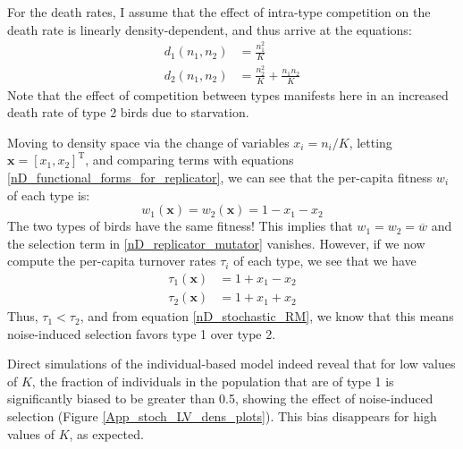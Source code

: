For the death rates, I assume that the effect of intra-type competition on the death rate is linearly density-dependent, and thus arrive at the equations:
\begin{equation}
\label{App_example_stoch_LV_death_rates}
\begin{aligned}
	d_{1}({n_1},{n_2}) &= \frac{{n_1^2}}{K}\\
	d_{2}({n_1},{n_2}) &= \frac{{n_2^2}}{K} + \frac{{n_1}{n_2}}{K}
\end{aligned}
\end{equation}
Note that the effect of competition between types manifests here in an increased death rate of type 2 birds due to starvation.

Moving to density space via the change of variables $x_i = n_i/K$, letting $\mathbf{x} = [x_1, x_2]^{\mathrm{T}}$, and comparing terms with equations \eqref{nD_functional_forms_for_replicator}, we can see that the per-capita fitness $w_i$ of each type is:
\begin{equation*}
	w_{1}(\mathbf{x}) = w_{2}(\mathbf{x}) = 1 - x_1 - x_2
\end{equation*}
The two types of birds have the same fitness! This implies that $w_1 = w_2 = \overline{w}$ and the selection term in \eqref{nD_replicator_mutator} vanishes.
However, if we now compute the per-capita turnover rates $\tau_i$  of each type, we see that we have
\begin{align*}
	\tau_{1}(\mathbf{x}) &= 1 + x_1 - x_2\\
	\tau_{2}(\mathbf{x}) &= 1 + x_1 + x_2
\end{align*}
Thus, $\tau_{1} < \tau_{2}$, and from equation \eqref{nD_stochastic_RM}, we know that this means noise-induced selection favors type 1 over type 2.

Direct simulations of the individual-based model indeed reveal that for low values of $K$, the fraction of individuals in the population that are of type 1 is significantly biased to be greater than 0.5, showing the effect of noise-induced selection (Figure \ref{App_stoch_LV_dens_plots}). This bias disappears for high values of $K$, as expected.

